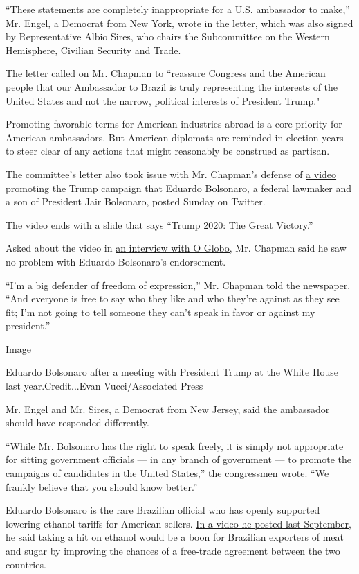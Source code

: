 ``These statements are completely inappropriate for a U.S. ambassador to
make,'' Mr. Engel, a Democrat from New York, wrote in the letter, which
was also signed by Representative Albio Sires, who chairs the
Subcommittee on the Western Hemisphere, Civilian Security and Trade.

The letter called on Mr. Chapman to ``reassure Congress and the American
people that our Ambassador to Brazil is truly representing the interests
of the United States and not the narrow, political interests of
President Trump."

Promoting favorable terms for American industries abroad is a core
priority for American ambassadors. But American diplomats are reminded
in election years to steer clear of any actions that might reasonably be
construed as partisan.

The committee's letter also took issue with Mr. Chapman's defense of
\href{https://twitter.com/BolsonaroSP/status/1287540044677488641?s=20}{a
video} promoting the Trump campaign that Eduardo Bolsonaro, a federal
lawmaker and a son of President Jair Bolsonaro, posted Sunday on
Twitter.

The video ends with a slide that says ``Trump 2020: The Great Victory.''

Asked about the video in
\href{https://oglobo.globo.com/mundo/embaixador-dos-eua-defende-eduardo-bolsonaro-apos-critica-de-deputado-americano-liberdade-de-expressao-24555110}{an
interview with O Globo,} Mr. Chapman said he saw no problem with Eduardo
Bolsonaro's endorsement.

``I'm a big defender of freedom of expression,'' Mr. Chapman told the
newspaper. ``And everyone is free to say who they like and who they're
against as they see fit; I'm not going to tell someone they can't speak
in favor or against my president.''

Image

Eduardo Bolsonaro after a meeting with President Trump at the White
House last year.Credit...Evan Vucci/Associated Press

Mr. Engel and Mr. Sires, a Democrat from New Jersey, said the ambassador
should have responded differently.

``While Mr. Bolsonaro has the right to speak freely, it is simply not
appropriate for sitting government officials --- in any branch of
government --- to promote the campaigns of candidates in the United
States,'' the congressmen wrote. ``We frankly believe that you should
know better.''

Eduardo Bolsonaro is the rare Brazilian official who has openly
supported lowering ethanol tariffs for American sellers.
\href{https://www.facebook.com/bolsonaro.enb/posts/1250533498472605}{In
a video he posted last September}, he said taking a hit on ethanol would
be a boon for Brazilian exporters of meat and sugar by improving the
chances of a free-trade agreement between the two countries.

